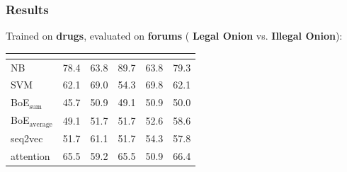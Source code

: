 \documentclass[t,xcolor={svgnames,table}]{beamer}
\begin{document}
\begin{frame}
	\frametitle{Results}
	
	Trained on \textbf{drugs},
	evaluated on \textbf{forums} (\textbf{\color{green} Legal Onion} vs. \textbf{\color{red} Illegal Onion}):
	
	\begin{center}
		\setlength{\tabcolsep}{8pt}
		\begin{tabular}{l *{5}{R}}
		& 
		& 
		& 
		& 
		& \\
		\hline
		NB & 78.4 & 63.8 & 89.7 & 63.8 & 79.3\\
		SVM & 62.1 & 69.0 & 54.3 & 69.8 & 62.1\\
		BoE$_\mathrm{sum}$ & 45.7 & 50.9 & 49.1 & 50.9 & 50.0\\
		BoE$_\mathrm{average}$ & 49.1 & 51.7 & 51.7 & 52.6 & 58.6\\
		seq2vec & 51.7 & 61.1 & 51.7 & 54.3 & 57.8\\
		attention & 65.5 & 59.2 & 65.5 & 50.9 & 66.4
		\end{tabular}
	\end{center}
\end{frame}

\section*{}
\end{document}
